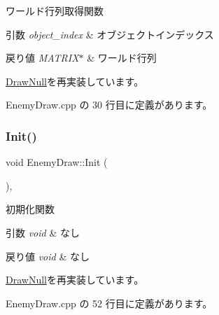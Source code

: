 ワールド行列取得関数 


\begin{DoxyParams}{引数}
{\em object\+\_\+index} & オブジェクトインデックス \\
\hline
\end{DoxyParams}

\begin{DoxyRetVals}{戻り値}
{\em M\+A\+T\+R\+I\+X$\ast$} & ワールド行列 \\
\hline
\end{DoxyRetVals}


\mbox{\hyperlink{class_draw_null_a9aac059eb3b5d1f77e8bd3aa0647cff9}{Draw\+Null}}を再実装しています。



 Enemy\+Draw.\+cpp の 30 行目に定義があります。

\mbox{\label{class_enemy_draw_aa1659c35fa757db6a6cf07e26ad9ddfb}} 
\subsubsection{\texorpdfstring{Init()}{Init()}}
{\footnotesize\ttfamily void Enemy\+Draw\+::\+Init (\begin{DoxyParamCaption}{ }\end{DoxyParamCaption})\hspace{0.3cm}{\ttfamily [override]}, {\ttfamily [virtual]}}



初期化関数 


\begin{DoxyParams}{引数}
{\em void} & なし \\
\hline
\end{DoxyParams}

\begin{DoxyRetVals}{戻り値}
{\em void} & なし \\
\hline
\end{DoxyRetVals}


\mbox{\hyperlink{class_draw_null_a20aef1e54c1a158b741bfd731e18efdf}{Draw\+Null}}を再実装しています。



 Enemy\+Draw.\+cpp の 52 行目に定義があります。

\mbox{\label{class_enemy_draw_a2861dc0623b0be7726bc69a6a469190e}} 
